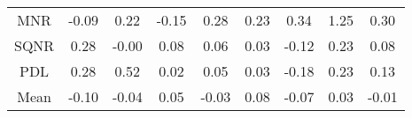 \documentclass[11pt,a4paper]{report}
\begin{document}
\begin{longtable}{ | c || c | c | c | c | c | c | c || c |}
MNR &  \cellcolor[HTML]{FFFFFF} -0.09 &  \cellcolor[HTML]{F7F7FF} 0.22 &  \cellcolor[HTML]{FFFFFF} -0.15 &  \cellcolor[HTML]{F7F7FF} 0.28 &  \cellcolor[HTML]{F7F7FF} 0.23 &  \cellcolor[HTML]{F7F7FF} 0.34 &  \cellcolor[HTML]{DFDFFF} 1.25 &  \cellcolor[HTML]{F7F7FF} 0.30 \\
SQNR &  \cellcolor[HTML]{F7F7FF} 0.28 &  \cellcolor[HTML]{FFFFFF} -0.00 &  \cellcolor[HTML]{FFFFFF} 0.08 &  \cellcolor[HTML]{FFFFFF} 0.06 &  \cellcolor[HTML]{FFFFFF} 0.03 &  \cellcolor[HTML]{FFFFFF} -0.12 &  \cellcolor[HTML]{F7F7FF} 0.23 &  \cellcolor[HTML]{FFFFFF} 0.08 \\
PDL &  \cellcolor[HTML]{F7F7FF} 0.28 &  \cellcolor[HTML]{EFEFFF} 0.52 &  \cellcolor[HTML]{FFFFFF} 0.02 &  \cellcolor[HTML]{FFFFFF} 0.05 &  \cellcolor[HTML]{FFFFFF} 0.03 &  \cellcolor[HTML]{FFF7F7} -0.18 &  \cellcolor[HTML]{F7F7FF} 0.23 &  \cellcolor[HTML]{FFFFFF} 0.13 \\
\hline
\hline
Mean  &  \cellcolor[HTML]{FFFFFF} -0.10 &  \cellcolor[HTML]{FFFFFF} -0.04 &  \cellcolor[HTML]{FFFFFF} 0.05 &  \cellcolor[HTML]{FFFFFF} -0.03 &  \cellcolor[HTML]{FFFFFF} 0.08 &  \cellcolor[HTML]{FFFFFF} -0.07 &  \cellcolor[HTML]{FFFFFF} 0.03 &  \cellcolor[HTML]{FFFFFF} -0.01 \\
\hline
\end{longtable}
\end{document}
